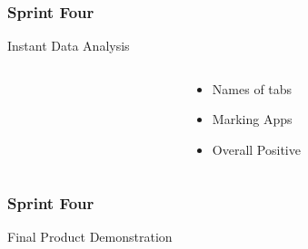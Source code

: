\begin{frame}
\frametitle{Sprint Four}
\begin{center}
Instant Data Analysis\\
\vspace{\baselineskip}
\begin{columns}
\begin{column}{0.5\textwidth}
\end{column}
\begin{column}{0.5\textwidth}

\begin{itemize}
\item<1>Names of tabs
\item<2>Marking Apps
\item<3>Overall Positive
\end{itemize}

\end{column}
\end{columns}
\end{center}
\end{frame}

\begin{frame}

\frametitle{Sprint Four}
\begin{center}
Final Product Demonstration
\end{center}
\end{frame}